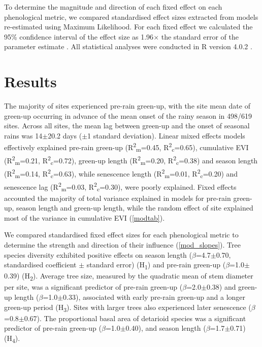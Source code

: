 \documentclass[11pt,a4paper]{article}
\begin{document}
To determine the magnitude and direction of each fixed effect on each
phenological metric, we compared standardised effect sizes extracted from
models re-estimated using Maximum Likelihood. For each fixed effect we
calculated the 95\% confidence interval of the effect size as 1.96$\times{}$
the standard error of the parameter estimate \citep{Zuur2010}. All statistical
analyses were conducted in R version 4.0.2 \citep{R2020}.

\section{Results}

The majority of sites experienced pre-rain green-up, with the site mean date of
green-up occurring in advance of the mean onset of the rainy season in 498/619
sites. Across all sites, the mean lag between green-up and the onset of
seasonal rains was 14$\pm$20.2 days ($\pm{}$1 standard deviation). Linear mixed
effects models effectively explained 
pre-rain green-up (R\textsuperscript{2}\textsubscript{m}=0.45,
R\textsuperscript{2}\textsubscript{c}=0.65), 
cumulative EVI (R\textsuperscript{2}\textsubscript{m}=0.21,
R\textsuperscript{2}\textsubscript{c}=0.72), 
green-up length (R\textsuperscript{2}\textsubscript{m}=0.20,
R\textsuperscript{2}\textsubscript{c}=0.38) and 
season length (R\textsuperscript{2}\textsubscript{m}=0.14,
R\textsuperscript{2}\textsubscript{c}=0.63), while 
senescence length (R\textsuperscript{2}\textsubscript{m}=0.01,
R\textsuperscript{2}\textsubscript{c}=0.20) and 
senescence lag (R\textsuperscript{2}\textsubscript{m}=0.03,
R\textsuperscript{2}\textsubscript{c}=0.30), were poorly explained. Fixed
effects accounted the majority of total variance explained in models for
pre-rain green-up, season length and green-up length, while the random effect
of site explained most of the variance in cumulative EVI (\autoref{modtab}).

We compared standardised fixed effect sizes for each phenological metric to
determine the strength and direction of their influence (\autoref{mod_slopes}).
Tree species diversity exhibited positive effects on season length
($\beta$=4.7$\pm$0.70, standardised coefficient $\pm$ standard error)
(H\textsubscript{1}) and pre-rain green-up ($\beta$=1.0$\pm$0.39)
(H\textsubscript{2}). Average tree size, measured by the quadratic mean of stem
diameter per site, was a significant predictor of pre-rain green-up
($\beta$=2.0$\pm$0.38) and green-up length ($\beta$=1.0$\pm$0.33), associated
with early pre-rain green-up and a longer green-up period (H\textsubscript{3}).
Sites with larger trees also experienced later senescence
($\beta$=0.8$\pm$0.67). The proportional basal area of detarioid species was a
significant predictor of pre-rain green-up ($\beta$=1.0$\pm$0.40), and season
length ($\beta$=1.7$\pm$0.71) (H\textsubscript{4}). 
\end{document}
